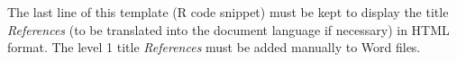 \documentclass[fleqn,]{article} %
\begin{document}
The last line of this template (R code snippet) must be kept to display the title \emph{References} (to be translated into the document language if necessary) in HTML format.
The level 1 title \emph{References} must be added manually to Word files.



\makeatletter

\makeatother


\end{document}
